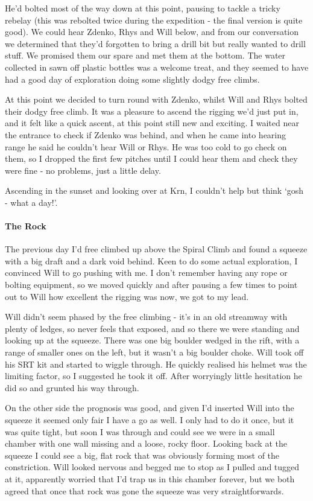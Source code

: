 He’d bolted most of the way down at this point, pausing to tackle a tricky rebelay (this was rebolted twice during the expedition - the final version is quite good). We could hear Zdenko, Rhys and Will below, and from our conversation we determined that they’d forgotten to bring a drill bit but really wanted to drill stuff. We promised them our spare and met them at the bottom. The water collected in sawn off plastic bottles was a welcome treat, and they seemed to have had a good day of exploration doing some slightly dodgy free climbs.

At this point we decided to turn round with Zdenko, whilst Will and Rhys bolted their dodgy free climb. It was a pleasure to ascend the rigging we’d just put in, and it felt like a quick ascent, at this point still new and exciting. I waited near the entrance to check if Zdenko was behind, and when he came into hearing range he said he couldn’t hear Will or Rhys. He was too cold to go check on them, so I dropped the first few pitches until I could hear them and check they were fine - no problems, just a little delay.

Ascending in the sunset and looking over at Krn, I couldn’t help but think ‘gosh - what a day!’.

\paragraph{The Rock}
The previous day I’d free climbed up above the Spiral Climb and found a squeeze with a big draft and a dark void behind. Keen to do some actual exploration, I convinced Will to go pushing with me. I don’t remember having any rope or bolting equipment, so we moved quickly and after pausing a few times to point out to Will how excellent the rigging was now, we got to my lead.

Will didn’t seem phased by the free climbing - it’s in an old streamway with plenty of ledges, so never feels that exposed, and so there we were standing and looking up at the squeeze. There was one big boulder wedged in the rift, with a range of smaller ones on the left, but it wasn’t a big boulder choke. Will took off his SRT kit and started to wiggle through. He quickly realised his helmet was the limiting factor, so I suggested he took it off. After worryingly little hesitation he did so and grunted his way through.

On the other side the prognosis was good, and given I’d inserted Will into the squeeze it seemed only fair I have a go as well. I only had to do it once, but it was quite tight, but soon I was through and could see we were in a small chamber with one wall missing and a loose, rocky floor. Looking back at the squeeze I could see a big, flat rock that was obviously forming most of the constriction. Will looked nervous and begged me to stop as I pulled and tugged at it, apparently worried that I’d trap us in this chamber forever, but we both agreed that once that rock was gone the squeeze was very straightforwards.

